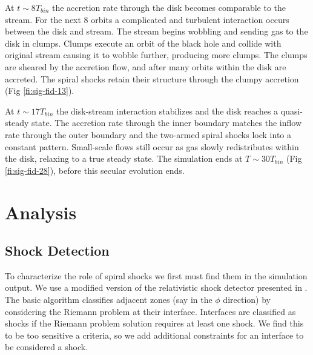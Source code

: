 \documentclass{emulateapj}
\begin{document}
At $t\sim 8 T_{bin}$ the accretion rate through the disk becomes comparable to the stream.  For the next 8 orbits a complicated and turbulent interaction occurs between the disk and stream.  The stream begins wobbling and sending gas to the disk in clumps.  Clumps execute an orbit of the black hole and collide with original stream causing it to wobble further, producing more clumps.  The clumps are sheared by the accretion flow, and after many orbits within the disk are accreted. The spiral shocks retain their structure through the clumpy accretion (Fig \ref{fi:sig-fid-13}).

At $t\sim17 T_{bin}$ the disk-stream interaction stabilizes and the disk reaches a quasi-steady state.  The accretion rate through the inner boundary matches the inflow rate through the outer boundary and the two-armed spiral shocks lock into a constant pattern.  Small-scale flows still occur as gas slowly redistributes within the disk, relaxing to a true steady state.  The simulation ends at $T\sim30 T_{bin}$ (Fig \ref{fi:sig-fid-28}), before this secular evolution ends.

\begin{figure*}
\caption{\label{fi:sig-fid-28} As Fig. \ref{fi:sig-fid-0}, but at $t = 28 T_{bin}$}
\end{figure*}



\section{Analysis}
\label{sec:analysis}


\subsection{Shock Detection}
\label{subsec:shockDet}

To characterize the role of spiral shocks we first must find them in the simulation output.  We use a modified version of the relativistic shock detector presented in \citep{Zanotti10}.  The basic algorithm classifies adjacent zones (say in the $\phi$ direction) by considering the Riemann problem at their interface.  Interfaces are classified as shocks if the Riemann problem solution requires at least one shock.  We find this to be too sensitive a criteria, so we add additional constraints for an interface to be considered a shock.
\end{document}
